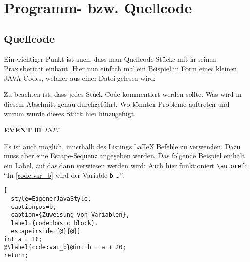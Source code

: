 \chapter{Programm- bzw. Quellcode}
\section{Quellcode}
Ein wichtiger Punkt ist auch, dass man Quellcode Stücke mit in seinen Praxisbericht einbaut. Hier nun einfach mal ein Beispiel in Form eines kleinen JAVA Codes, welcher aus einer Datei gelesen wird:



Zu beachten ist, dass jedes Stück Code kommentiert werden sollte. Was wird in diesem Abschnitt genau durchgeführt. Wo könnten Probleme auftreten und warum wurde dieses Stück hier hinzugefügt.

\vspace*{0.5cm}

\pagebreak
\textbf{EVENT 01} \textit{INIT}


Es ist auch möglich, innerhalb des Listings \LaTeX{} Befehle zu verwenden. Dazu muss aber eine Escape-Sequenz angegeben werden. Das folgende Beispiel enthält ein Label, auf das dann verwiesen werden wird: Auch hier funktioniert \texttt{\textbackslash{}autoref}: \enquote{In \autoref{code:var_b} wird der Variable \texttt{b} \ldots}.

\begin{lstlisting}[
  style=EigenerJavaStyle,
  captionpos=b,
  caption={Zuweisung von Variablen},
  label={code:basic_block},
  escapeinside={@}{@}]
int a = 10;
@\label{code:var_b}@int b = a + 20;
return;
\end{lstlisting}

